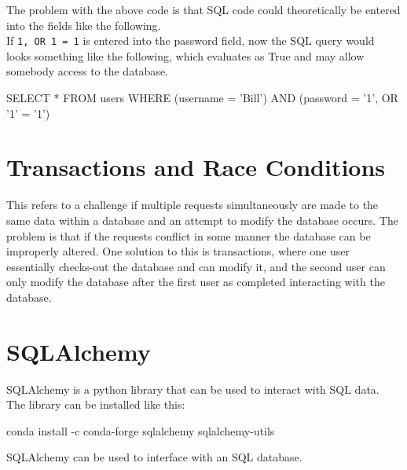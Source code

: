 \documentclass[]{book}
\newenvironment{Shaded}{\begin{snugshade}}{\end{snugshade}}
\newcommand{\StringTok}[1]{\textcolor[rgb]{0.31,0.60,0.02}{#1}}
\newcommand{\ExtensionTok}[1]{#1}
\newcommand{\NormalTok}[1]{#1}
\begin{document}
The problem with the above code is that SQL code could theoretically be
entered into the fields like the following.\\
If
\texttt{1\textquotesingle{},\ OR\ \textquotesingle{}1\textquotesingle{}\ =\ \textquotesingle{}1\textquotesingle{}}
is entered into the password field, now the SQL query would looks
something like the following, which evaluates as True and may allow
somebody access to the database.

\begin{Shaded}
\begin{Highlighting}[]
\ExtensionTok{SELECT}\NormalTok{ * FROM users WHERE (username = }\StringTok{'Bill'}\NormalTok{) }\ExtensionTok{AND}\NormalTok{ (password = }\StringTok{'1'}\NormalTok{, OR }\StringTok{'1'}\NormalTok{ = }\StringTok{'1'}\NormalTok{)}
\end{Highlighting}
\end{Shaded}

\section{Transactions and Race
Conditions}\label{transactions-and-race-conditions}

This refers to a challenge if multiple requests simultaneously are made
to the same data within a database and an attempt to modify the database
occurs. The problem is that if the requests conflict in some manner the
database can be improperly altered. One solution to this is
transactions, where one user essentially checks-out the database and can
modify it, and the second user can only modify the database after the
first user as completed interacting with the database.

\section{SQLAlchemy}\label{sqlalchemy}

SQLAlchemy is a python library that can be used to interact with SQL
data.\\
The library can be installed like this:

\begin{Shaded}
\begin{Highlighting}[]
\ExtensionTok{conda}\NormalTok{ install -c conda-forge sqlalchemy sqlalchemy-utils}
\end{Highlighting}
\end{Shaded}

SQLAlchemy can be used to interface with an SQL database.
\end{document}

